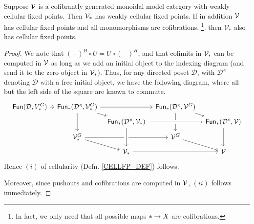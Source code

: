 \documentclass[a4paper,10pt
,draft
]{article}%
\renewcommand{\1}{\eta}%
\begin{document}
{  \begin{lemma}
        \label{PT_CELL_LEM}
        Suppose $\mathcal V$ is a  cofibrantly generated monoidal model category with weakly cellular fixed points.
        Then $\V_{\**}$ has weakly cellular fixed points.
        If in addition $\mathcal V$ has cellular fixed points and all monomorphisms are cofibrations,
        \footnote{
          In fact, we only need that all possible maps $\** \to X$ are cofibrations.
        }.
        then $\V_{\**}$ also has cellular fixed points.
  \end{lemma}
  \begin{proof}
        We note that $(-)^H \circ U = U \circ (-)^H$,
        and that colimits in $\V_{\**}$ can be computed in $\mathcal V$ as long as we add an initial object to the indexing diagram (and send it to the zero object in $\V_{\**}$).
        Thus, for any directed poset $\mathcal D$, with $\mathcal D^\triangleleft$ denoting $\mathcal D$ with a free initial object,
        we have the following diagram, where all but the left side of the square are known to commute.
        \begin{equation}
              \begin{tikzcd}[row sep = tiny, column sep = tiny]
                    \Fun(\mathcal D, V^G_{\**}) \arrow[r]
                    &
                    \Fun_{\**}(\mathcal D^\triangleleft, \V^G_{\**}) \arrow[rr] \arrow[dd] \arrow[dr]
                    &&
                    \Fun_{\**}(\mathcal D^\triangleleft, \V^G) \arrow[dd] \arrow[dr]
                    \\
                    &&
                    \Fun_{\**}(\mathcal D^\triangleleft, \V_{\**}) \arrow[rr, crossing over]
                    &&
                    \Fun_{\**}(\mathcal D^\triangleleft, \V) \arrow[dd]
                    \\
                    &
                    \V^G_{\**} \arrow[rr] \arrow[dr]
                    &&
                    \V^G \arrow[dr]
                    \\
                    &&
                    \V_{\**} \arrow[rr] \arrow[uu, leftarrow, crossing over]
                    &&
                    \V
              \end{tikzcd}
        \end{equation}
        Hence $(i)$ of cellularity (Defn. \ref{CELLFP_DEF}) follows.
        
        Moreover, since pushouts and cofibrations are computed in $\mathcal V$, $(ii)$ follows immediately.
        

\end{proof}}
\end{document}
